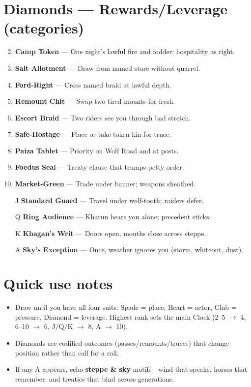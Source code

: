 \section*{Diamonds --- Rewards/Leverage (categories)}
\label{sec:ykrul-rewards}
\begin{enumerate}
\setcounter{enumi}{1}
\item \textbf{Camp Token} --- One night's lawful fire and fodder; hospitality as right.
\item \textbf{Salt Allotment} --- Draw from named store without quarrel.
\item \textbf{Ford-Right} --- Cross named braid at lawful depth.
\item \textbf{Remount Chit} --- Swap two tired mounts for fresh.
\item \textbf{Escort Braid} --- Two riders see you through bad stretch.
\item \textbf{Safe-Hostage} --- Place or take token-kin for truce.
\item \textbf{Paiza Tablet} --- Priority on Wolf Road and at posts.
\item \textbf{Foedus Seal} --- Treaty clause that trumps petty order.
\item \textbf{Market-Green} --- Trade under banner; weapons sheathed.
\item[J] \textbf{Standard Guard} --- Travel under wolf-tooth; raiders defer.
\item[Q] \textbf{Ring Audience} --- Khatun hears you alone; precedent sticks.
\item[K] \textbf{Khagan's Writ} --- Doors open, mouths close across steppe.
\item[A] \textbf{Sky's Exception} --- Once, weather ignores you (storm, whiteout, dust).
\end{enumerate}

\section*{Quick use notes}
\label{sec:ykrul-quick-use}
\begin{itemize}
\item Draw until you have all four suits: Spade = place, Heart = actor, Club = pressure, Diamond = leverage. Highest rank sets the main Clock (2--5 $\rightarrow$ 4, 6--10 $\rightarrow$ 6, J/Q/K $\rightarrow$ 8, A $\rightarrow$ 10).
\item Diamonds are codified outcomes (passes/remounts/truces) that change position rather than call for a roll.
\item If any A appears, echo \textbf{steppe \& sky} motifs---wind that speaks, horses that remember, and treaties that bind across generations.
\end{itemize}


